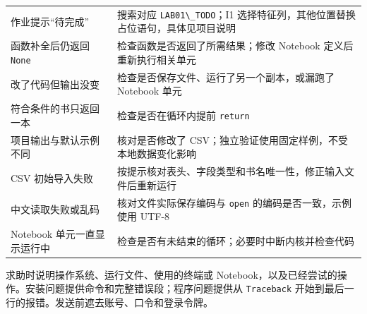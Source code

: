 \documentclass[UTF8,a4paper,11pt,fontset=fandol]{ctexart}
\providecommand{\passthrough}[1]{#1}
\begin{document}
\begin{longtable}[]{@{}
  >{\raggedright\arraybackslash}p{}
  >{\raggedright\arraybackslash}p{}@{}}
作业提示``待完成'' & 搜索对应 \passthrough{\lstinline!LAB01\_TODO!}；I1 选择特征列，其他位置替换占位语句，具体见项目说明 \\
函数补全后仍返回 \passthrough{\lstinline!None!} & 检查函数是否返回了所需结果；修改 Notebook 定义后重新执行相关单元 \\
改了代码但输出没变 & 检查是否保存文件、运行了另一个副本，或漏跑了 Notebook 单元 \\
符合条件的书只返回一本 & 检查是否在循环内提前 \passthrough{\lstinline!return!} \\
项目输出与默认示例不同 & 核对是否修改了 CSV；独立验证使用固定样例，不受本地数据变化影响 \\
CSV 初始导入失败 & 按提示核对表头、字段类型和书名唯一性，修正输入文件后重新运行 \\
中文读取失败或乱码 & 核对文件实际保存编码与 \passthrough{\lstinline!open!} 的编码是否一致，示例使用 UTF-8 \\
Notebook 单元一直显示运行中 & 检查是否有未结束的循环；必要时中断内核并检查代码 \\
\end{longtable}

求助时说明操作系统、运行文件、使用的终端或 Notebook，以及已经尝试的操作。安装问题提供命令和完整错误段；程序问题提供从 \passthrough{\lstinline!Traceback!} 开始到最后一行的报错。发送前遮去账号、口令和登录令牌。
\end{document}
